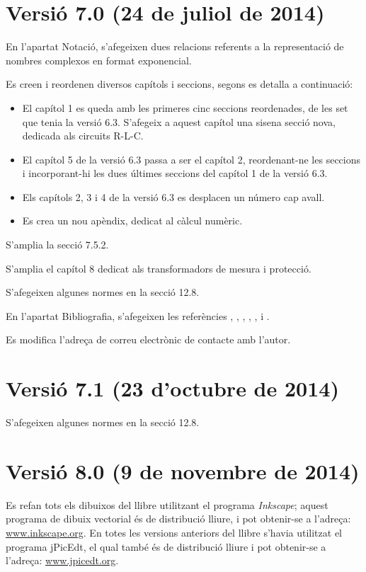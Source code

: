 \section*{Versió 7.0 (24 de juliol de 2014)}

En l'apartat Notació, s'afegeixen dues  relacions referents a la representació de nombres complexos en format exponencial.

Es creen i reordenen diversos capítols i seccions, segons es detalla a continuació:
\begin{itemize}
   \item El capítol 1 es queda amb les primeres cinc seccions reordenades, de les set que tenia la versió 6.3. S'afegeix a aquest capítol una sisena secció nova, dedicada als circuits R-L-C.
   \item El capítol 5 de la versió 6.3 passa a ser el capítol 2, reordenant-ne les  seccions i incorporant-hi les dues últimes seccions del capítol 1 de la versió 6.3.
   \item Els capítols 2, 3 i 4  de la versió 6.3 es desplacen un número cap avall.
   \item Es crea un nou apèndix, dedicat al càlcul numèric.
\end{itemize}

S'amplia la secció 7.5.2.

S'amplia el capítol 8 dedicat als transformadors de mesura i protecció.

S'afegeixen algunes normes en la secció 12.8.

En l'apartat Bibliografia, s'afegeixen les referències \cite{GOM}, \cite{SPK}, \cite{JDH}, \cite{EJB},  \cite{PMA}, \cite{MAI} i \cite{KNU}.

Es modifica l'adreça de correu electrònic de contacte amb l'autor.


\section*{Versió 7.1 (23 d'octubre de 2014)}

S'afegeixen algunes normes en la secció 12.8.


\section*{Versió 8.0 (9 de novembre de 2014)}

Es refan tots els dibuixos del llibre utilitzant el programa \emph{Inkscape}; aquest programa de dibuix vectorial és de distribució lliure, i pot obtenir-se a l'adreça: \href{http://www.inkscape.org/}{www.inkscape.org}. En totes les versions anteriors del llibre s'havia utilitzat el programa jPicEdt, el qual també és de distribució lliure i pot obtenir-se a l'adreça: \href{http://www.jpicedt.org/}{www.jpicedt.org}.

